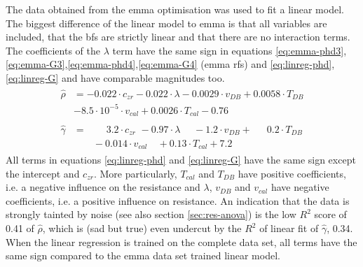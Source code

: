 The data obtained from the \gls{emma} optimisation was used to fit a linear model. 
The biggest difference of the linear model to \gls{emma} is that all variables are included, that the \gls{bf}s are strictly linear and that there are no interaction terms. 
The coefficients of the $\lambda$ term have the same sign in equations \ref{eq:emma-phd3},\ref{eq:emma-G3},\ref{eq:emma-phd4},\ref{eq:emma-G4} (\gls{emma} \gls{rf}s) and \ref{eq:linreg-phd},\ref{eq:linreg-G} and have comparable magnitudes too. 
%
%
\begin{align}
	\begin{split}
		\label{eq:linreg-phd}
		\hat{\rho} &=  -0.022\cdot c_{zr} -0.022\cdot \lambda -0.0029\cdot v_{DB} + 0.0058\cdot T_{DB} \\
		& -8.5\cdot 10^{-5}\cdot v_{cal} + 0.0026\cdot T_{cal} -0.76
	\end{split}
	\\
	\begin{split}
		\label{eq:linreg-G}
		\hat{\gamma} &={}  \qquad 3.2\cdot c_{zr} \,\, - 0.97\cdot \lambda \,\,\quad - 1.2\cdot v_{DB} + \,\,\,\quad 0.2\cdot T_{DB} \\
			& \qquad - 0.014\cdot v_{cal} \quad + 0.13\cdot T_{cal} + 7.2
	\end{split}
\end{align}
%
All terms in equations \ref{eq:linreg-phd} and \ref{eq:linreg-G} have the same sign except the intercept and $c_{zr}$. 
%
More particularly, $T_{cal}$ and $T_{DB}$ have positive coefficients, i.e. a negative influence on the resistance 
and $\lambda$, $v_{DB}$ and $v_{cal}$ have negative coefficients, i.e. a positive influence on resistance. 
An indication that the data is strongly tainted by noise (see also section \ref{sec:res-anova}) is the low $R^2$ score of 0.41 of $\hat\rho$, 
which is (sad but true) even undercut by the $R^2$ of linear fit of $\hat\gamma$, 0.34. 
When the linear regression is trained on the complete data set, all terms have the same sign compared to the \gls{emma} data set trained linear model. 
